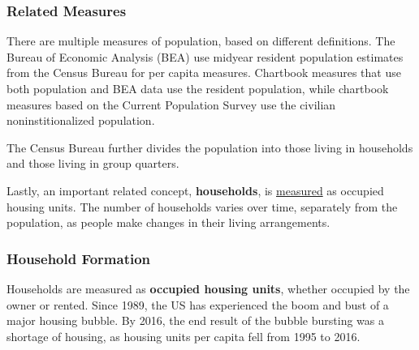 \documentclass{report}
\begin{document}
{\begin{minipage}{0.76\textwidth}
\subsubsection*{Related Measures}
\small There are multiple measures of population, based on different definitions. The Bureau of Economic Analysis (BEA) use midyear resident population estimates from the Census Bureau for per capita measures. Chartbook measures that use both population and BEA data use the resident population, while chartbook measures based on the Current Population Survey use the civilian noninstitionalized population. 

The Census Bureau further divides the population into those living in households and those living in group quarters.  

Lastly, an important related concept, \textbf{households}, is \href{https://www.census.gov/housing/hvs/index.html}{measured} as occupied housing units. The number of households varies over time, separately from the population, as people make changes in their living arrangements.  
\end{minipage}
\newpage
\begin{minipage}{0.76\textwidth}
\subsubsection*{Household Formation}
\small Households are measured as \textbf{occupied housing units}, whether occupied by the owner or rented. Since 1989, the US has experienced the boom and bust of a major housing bubble. By 2016, the end result of the bubble bursting was a shortage of housing, as housing units per capita fell from 1995 to 2016. 
\vspace{1mm}
 

\end{minipage}}
\end{document}
